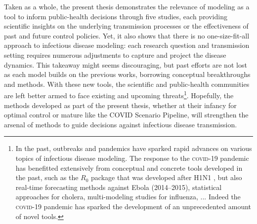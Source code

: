 Taken as a whole, the present thesis demonstrates the relevance of modeling as a tool to inform public-health decisions through five studies, each providing scientific insights on the underlying transmission processes or the effectiveness of past and future control policies. Yet, it also shows that there is no one-size-fit-all approach to infectious disease modeling: each research question and transmission setting requires numerous adjustments to capture and project the disease dynamics. %
This takeaway might seems discouraging, but past efforts are not lost as each model builds on the previous works, borrowing conceptual breakthroughs and methods. With these new tools, %
 the scientific and public-health communities are left better armed to face existing and upcoming threats\footnote[][-3\baselineskip]{In the past, outbreaks and pandemics have sparked rapid advances on various topics of infectious disease modeling. The response to the \textsc{covid}-19 pandemic has benefitted extensively from conceptual and concrete tools developed in the past, such as the $R_0$ package that was developed after H1N1 \parencite{Obadia:R0PackageToolbox:2012}, but also \eg real-time forecasting methods against Ebola (2014--2015), statistical approaches for cholera, multi-modeling studies for influenza, ... Indeed the \textsc{covid}-19 pandemic has sparked the development of an unprecedented amount of novel tools.}. Hopefully, the methods developed as part of the present thesis, whether at their infancy for optimal control or mature like the COVID Scenario Pipeline, will strengthen the arsenal of methods to guide decisions against infectious disease transmission.
  

